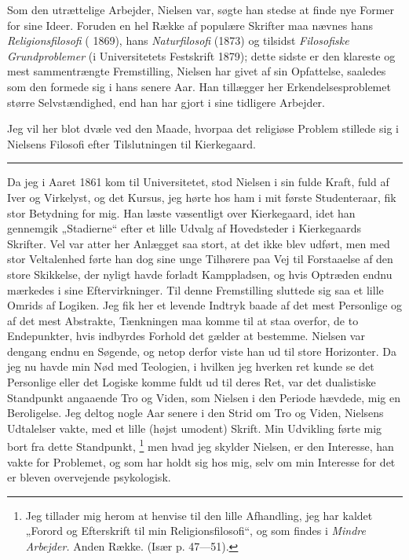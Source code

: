 \documentclass[12pt,a4paper,openany]{book}
\newcommand{\opage}[1]{\marginnote{\footnotesize\textit{[#1]}}}
\begin{document}
Som den utrættelige Arbejder, Nielsen var, søgte han stedse at finde nye Former
for sine Ideer. Foruden en hel Række af populære Skrifter maa nævnes hans
\textit{Religionsfilosofi} (
\setcounter{footnote}{0}%
\opage{191}1869), hans \textit{Naturfilosofi} (1873) og tilsidst
\textit{Filosofiske Grundproblemer} (i Universitetets Festskrift 1879); dette
sidste er den klareste og mest sammentrængte Fremstilling, Nielsen har givet af
sin Opfattelse, saaledes som den formede sig i hans senere Aar. Han tillægger
her Erkendelsesproblemet større Selvstændighed, end han har gjort i sine
tidligere Arbejder.

Jeg vil her blot dvæle ved den Maade, hvorpaa det religiøse Problem stillede
sig i Nielsens Filosofi efter Tilslutningen til Kierkegaard.

\begin{center}\rule{2cm}{0.4pt}\end{center}

Da jeg i Aaret 1861 kom til Universitetet, stod Nielsen i sin fulde Kraft, fuld
af Iver og Virkelyst, og det Kursus, jeg hørte hos ham i mit første
Studenteraar, fik stor Betydning for mig. Han læste væsentligt over
Kierkegaard, idet han gennemgik „Stadierne“ efter et lille Udvalg af
Hovedsteder i Kierkegaards Skrifter. Vel var atter her Anlægget saa stort, at
det ikke blev udført, men med stor Veltalenhed førte han dog sine unge
Tilhørere paa Vej til Forstaaelse af den store Skikkelse, der nyligt havde
forladt Kamppladsen, og hvis Optræden endnu mærkedes i sine Eftervirkninger.
Til denne Fremstilling sluttede sig saa et lille Omrids af Logiken. Jeg fik her
et levende Indtryk baade af det mest Personlige og af det mest Abstrakte,
Tænkningen maa komme til at staa overfor, de to Endepunkter, hvis indbyrdes
Forhold det gælder at bestemme. Nielsen var dengang endnu en Søgende, og netop
derfor viste han ud til store Horizonter. Da jeg nu havde min Nød med
Teologien, i hvilken jeg hverken ret kunde se det Personlige eller det Logiske
komme fuldt ud til deres Ret, var det dualistiske Standpunkt angaaende Tro og
Viden, som Nielsen i den Periode hævdede, mig en Beroligelse. Jeg deltog nogle
Aar senere i den Strid om Tro og Viden, Nielsens Udtalelser vakte, med et lille
(højst umodent) Skrift. Min Udvikling førte mig bort fra dette Standpunkt,%
\footnote[1]{Jeg tillader mig herom at henvise til den lille Afhandling, jeg
har kaldet „Forord og Efterskrift til min Religionsfilosofi“, og som findes i
\textit{Mindre Arbejder.} Anden Række. (Især p. 47---51).}
\setcounter{footnote}{0}%
\opage{192}men hvad jeg skylder Nielsen, er den Interesse, han vakte for
Problemet, og som har holdt sig hos mig, selv om min Interesse for det er
bleven overvejende psykologisk.
\end{document}
